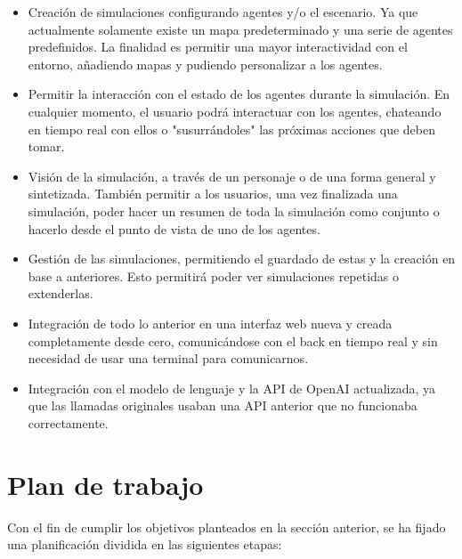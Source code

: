 \begin{itemize}
\item Creación de simulaciones configurando agentes y/o el escenario. Ya que actualmente solamente existe un mapa predeterminado y una serie de agentes predefinidos. La finalidad es permitir una mayor interactividad con el entorno, añadiendo mapas y pudiendo personalizar a los agentes.

\item Permitir la interacción con el estado de los agentes durante la simulación. En cualquier momento, el usuario podrá interactuar con los agentes, chateando en tiempo real con ellos o "susurrándoles" las próximas acciones que deben tomar.

\item Visión de la simulación, a través de un personaje o de una forma general y sintetizada. También permitir a los usuarios, una vez finalizada una simulación, poder hacer un resumen de toda la simulación como conjunto o hacerlo desde el punto de vista de uno de los agentes.

\item Gestión de las simulaciones, permitiendo el guardado de estas y la creación en base a anteriores. Esto permitirá poder ver simulaciones repetidas o extenderlas.

\item Integración de todo lo anterior en una interfaz web nueva y creada completamente desde cero, comunicándose con el back en tiempo real y sin necesidad de usar una terminal para comunicarnos.

\item Integración con el modelo de lenguaje y la API de OpenAI actualizada, ya que las llamadas originales usaban una API anterior que no funcionaba correctamente.

\end{itemize}


\section{Plan de trabajo}
Con el fin de cumplir los objetivos planteados en la sección anterior, se ha fijado una planificación dividida en las siguientes etapas:

